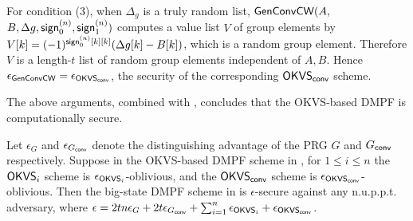 For condition (3), when $\Delta_g$ is a truly random list, ${\sf Gen}{\sf Conv}{\sf CW}(A,$\linebreak$B,\Delta g,{\sf sign}_0^{(n)},{\sf sign}_1^{(n)})$ computes a value list $V$ of group elements by $V[k] = (-1)^{{\sf sign}_0^{(n)}[k][k]}(\Delta g[k] - B[k])$, which is a random group element. Therefore $V$ is a length-$t$ list of random group elements independent of $A,B$. Hence $\epsilon_{{\sf Gen}{\sf Conv}{\sf CW}} = \epsilon_{{\sf OKVS}_{\sf conv}}$, the security of the corresponding ${\sf OKVS}_{\sf conv}$ scheme. 

The above arguments, combined with , concludes that the OKVS-based DMPF is computationally secure. 

\begin{theorem}\label{thm:OKVS_DMPF_secure}
    Let $\epsilon_G$ and $\epsilon_{G_{\sf conv}}$ denote the distinguishing advantage of the PRG $G$ and $G_{\sf conv}$ respectively. Suppose in the OKVS-based DMPF scheme in , for $1\le i\le n$ the ${\sf OKVS}_i$ scheme is $\epsilon_{{\sf OKVS}_i}$-oblivious, and the ${\sf OKVS}_{{\sf conv}}$ scheme is $\epsilon_{{\sf OKVS}_{\sf conv}}$-oblivious. Then the big-state DMPF scheme in  is $\epsilon$-secure against any n.u.p.p.t. adversary, where $\epsilon = 2tn\epsilon_G+2t\epsilon_{G_{\sf conv}} +\sum_{i=1}^n\epsilon_{{\sf OKVS}_i}+\epsilon_{{\sf OKVS}_{\sf conv}}$. 
\end{theorem}

